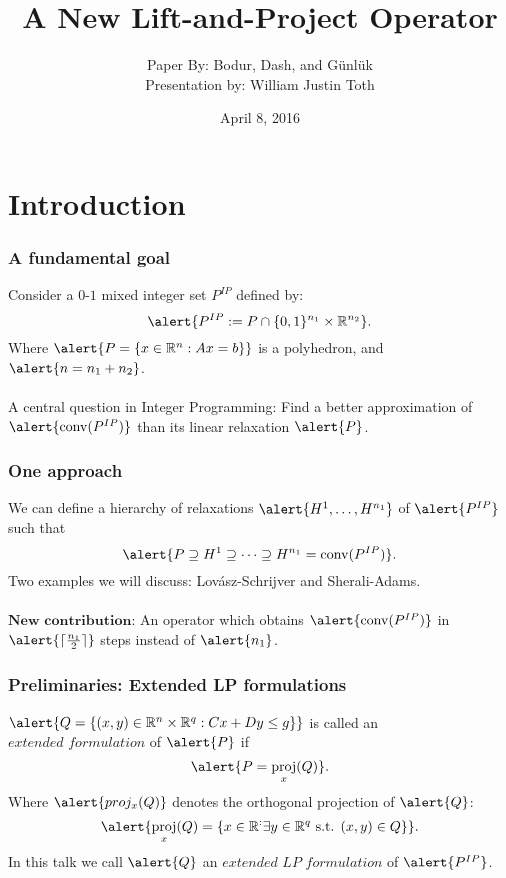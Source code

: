 \documentclass{beamer}
\author{Paper By: Bodur, Dash, and G\"{u}nl\"{u}k\\
Presentation by: William Justin Toth}
\institute{University of Waterloo}
\date{April 8, 2016}
\title{A New Lift-and-Project Operator}
\DeclarePairedDelimiter{\ceil}{\lceil}{\rceil}
\DeclareMathOperator{\conv}{conv}
\DeclareMathOperator{\proj}{proj}
\begin{document}
\begin{frame}
\titlepage
\end{frame}



\section{Introduction}

\begin{frame}
\frametitle{A fundamental goal}
Consider a $0$-$1$ mixed integer set \alert{$P^{IP}$} defined by:
$$\alert{P^{IP} := P \cap \{0,1\}^{n_1} \times \R^{n_2}}.$$
Where $\alert{P = \{x \in \R^n : Ax = b \}}$ is a polyhedron, and $\alert{n = n_1+ n_2}$.
\\\ \\
A central question in Integer Programming: Find a better approximation of $\alert{\conv(P^{IP})}$ than its linear relaxation $\alert{P}$.
\end{frame}

\begin{frame}
\frametitle{One approach}
We can define a hierarchy of relaxations $\alert{H^1, \dots, H^{n_1}}$ of $\alert{P^{IP}}$ such that
$$\alert{P \supseteq H^1 \supseteq \dots \supseteq H^{n_1} = \conv(P^{IP})}.$$
Two examples we will discuss: Lov\'asz-Schrijver and Sherali-Adams.\\\ \\
$\textbf{New contribution:}$ An operator which obtains $\alert{\conv(P^{IP})}$ in $\alert{\ceil{\frac{n_1}{2}}}$ steps instead of $\alert{n_1}$.
\end{frame}

\begin{frame}
\frametitle{Preliminaries: Extended LP formulations}
$\alert{Q = \{(x,y) \in \R^n \times \R^q : Cx + Dy \leq g \}}$ is called an $\textit{extended formulation}$ of $\alert{P}$ if
$$\alert{P = \proj_x(Q)}.$$
Where $\alert{proj_x(Q)}$ denotes the orthogonal projection of $\alert{Q}$:
$$\alert{\proj_x(Q) = \{x \in \R^: \exists y \in \R^q \text{ s.t. } (x,y) \in Q\}}.$$ 
In this talk we call $\alert{Q}$ an $\textit{extended LP formulation}$ of $\alert{P^{IP}}$.
\end{frame}
\end{document}
